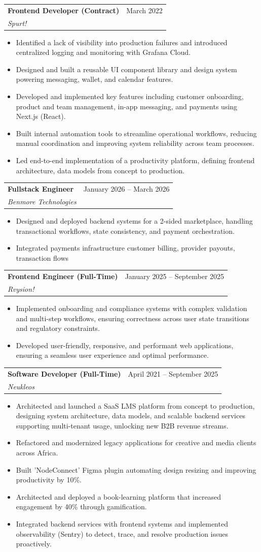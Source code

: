 \documentclass[letterpaper,11pt]{article}
\makeatletter
\newcommand{\resumeItem}[1]{
  \item\small{
    {#1 \vspace{-2pt}}
  }
}
\newcommand{\resumeSubheading}[4]{
  \vspace{-2pt}\item
    \begin{tabular*}{0.97\textwidth}[t]{l@{\extracolsep{\fill}}r}
      \textbf{#1} & #2 \\
      \textit{\small#3} & \textit{\small #4} \\
    \end{tabular*}\vspace{-7pt}
}
\newcommand{\resumeItemListStart}{\begin{itemize}[label=$\vcenter{\hbox{\tiny$\bullet$}}$]}
\newcommand{\resumeItemListEnd}{\end{itemize}\vspace{-5pt}}
\makeatother
\begin{document}
    \resumeSubheading
    {Frontend Developer (Contract)}{March 2022}
    {Spurt!} { }
    \resumeItemListStart
        \resumeItem{Identified a lack of visibility into production failures and introduced centralized logging and monitoring with Grafana Cloud.}
        \resumeItem{Designed and built a reusable UI component library and design system powering messaging, wallet, and calendar features.}
        \resumeItem{Developed and implemented key features including customer onboarding, product and team management, in-app messaging, and payments using Next.js (React).}
        \resumeItem{Built internal automation tools to streamline operational workflows, reducing manual coordination and improving system reliability across team processes.}
        \resumeItem{Led end-to-end implementation of a productivity platform, defining frontend architecture, data models from concept to production.}
    \resumeItemListEnd


    \resumeSubheading
    {Fullstack Engineer}{January 2026 -- March 2026}
    {Benmore Technologies} { }
    \resumeItemListStart
        \resumeItem{Designed and deployed backend systems for a 2-sided marketplace, handling transactional workflows, state consistency, and payment orchestration.}
        \resumeItem{Integrated payments infrastructure customer billing, provider payouts, transaction flows}
    \resumeItemListEnd


    \resumeSubheading
    {Frontend Engineer (Full-Time)}{January 2025 -- September 2025}
    {Rvysion!} { }
    \resumeItemListStart
        \resumeItem{Implemented onboarding and compliance systems with complex validation and multi-step workflows, ensuring correctness across user state transitions and regulatory constraints.}
        \resumeItem{Developed user-friendly, responsive, and performant web applications, ensuring a seamless user experience and optimal performance.}
    \resumeItemListEnd

    \resumeSubheading
    {Software Developer (Full-Time)}{April 2021 -- September 2025}
    {Neukleos} { }
    \resumeItemListStart
        \resumeItem{Architected and launched a SaaS LMS platform from concept to production, designing system architecture, data models, and scalable backend services supporting multi-tenant usage, unlocking new B2B revenue streams.}
        \resumeItem{Refactored and modernized legacy applications for creative and media clients across Africa.}
        \resumeItem{Built 'NodeConnect' Figma plugin automating design resizing and improving productivity by 10\%.}
        \resumeItem{Architected and deployed a book-learning platform that increased engagement by 40\% through gamification.}
        \resumeItem{Integrated backend services with frontend systems and implemented observability (Sentry) to detect, trace, and resolve production issues proactively.}
    \resumeItemListEnd
\end{document}
